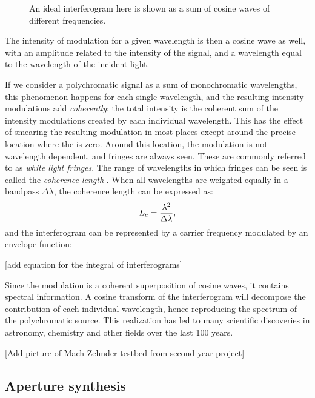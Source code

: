 \begin{figure}[!ht]
	\centering
	
	\caption[Simple interferogram]{An ideal interferogram here is shown as a sum of cosine waves of different frequencies.}
	\label{fig:interferogram}
    \end{figure}


The intensity of modulation for a given wavelength is then a cosine wave as well, with an amplitude related to the intensity of the signal, and a wavelength equal to the wavelength of the incident light.

If we consider a polychromatic signal as a sum of monochromatic wavelengths, this phenomenon happens for each single wavelength, and the resulting intensity modulations add \textit{coherently}: the total intensity is the coherent sum of the intensity modulations created by each individual wavelength. This has the effect of smearing the resulting modulation in most places except around the precise location where the \OPD is zero. Around this location, the modulation is not wavelength dependent, and fringes are always seen. These are commonly referred to as \textit{white light fringes}. The range of wavelengths in which fringes can be seen is called the \textit{coherence length} \Lc. When all wavelengths are weighted equally in a bandpass $\Delta\lambda$, the coherence length can be expressed as:
\begin{equation}
L_c = \frac{\lambda^2}{\Delta\lambda},
\end{equation}
and the interferogram can be represented by a carrier frequency modulated by an envelope function:

[add equation for the integral of interferograms]

Since the modulation is a coherent superposition of cosine waves, it contains spectral information. A cosine transform of the interferogram will decompose the contribution of each individual wavelength, hence reproducing the spectrum of the polychromatic source. This realization has led to many scientific discoveries in astronomy, chemistry and other fields over the last 100 years.

[Add picture of Mach-Zehnder testbed from second year project]

\subsection{Aperture synthesis}


